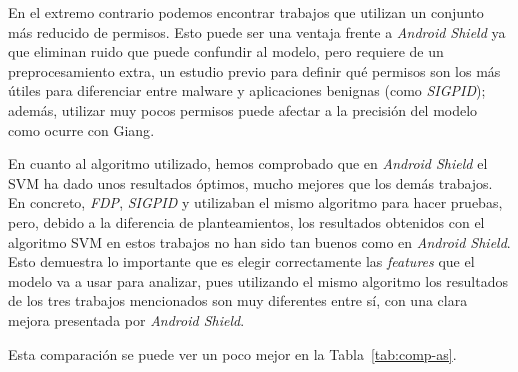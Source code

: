 En el extremo contrario podemos encontrar trabajos que utilizan un conjunto más reducido de permisos. Esto puede ser una ventaja frente a \textit{Android Shield} ya que eliminan ruido que puede confundir al modelo, pero requiere de un preprocesamiento extra, un estudio previo para definir qué permisos son los más útiles para diferenciar entre malware y aplicaciones benignas (como \textit{SIGPID}\hypersetup{citecolor=red}\cite{sigpid}); además, utilizar muy pocos permisos puede afectar a la precisión del modelo como ocurre con Giang\hypersetup{citecolor=red}\cite{giang}.

En cuanto al algoritmo utilizado, hemos comprobado que en \textit{Android Shield} el SVM ha dado unos resultados óptimos, mucho mejores que los demás trabajos. En concreto, \textit{FDP}\hypersetup{citecolor=red}\cite{jiang}, \textit{SIGPID}\hypersetup{citecolor=red}\cite{sigpid} y \hypersetup{citecolor=red}\cite{garg} utilizaban el mismo algoritmo para hacer pruebas, pero, debido a la diferencia de planteamientos, los resultados obtenidos con el algoritmo SVM en estos trabajos no han sido tan buenos como en \textit{Android Shield}. Esto demuestra lo importante que es elegir correctamente las \textit{features} que el modelo va a usar para analizar, pues utilizando el mismo algoritmo los resultados de los tres trabajos mencionados son muy diferentes entre sí, con una clara mejora presentada por \textit{Android Shield}.

Esta comparación se puede ver un poco mejor en la Tabla~\ref{tab:comp-as}.

